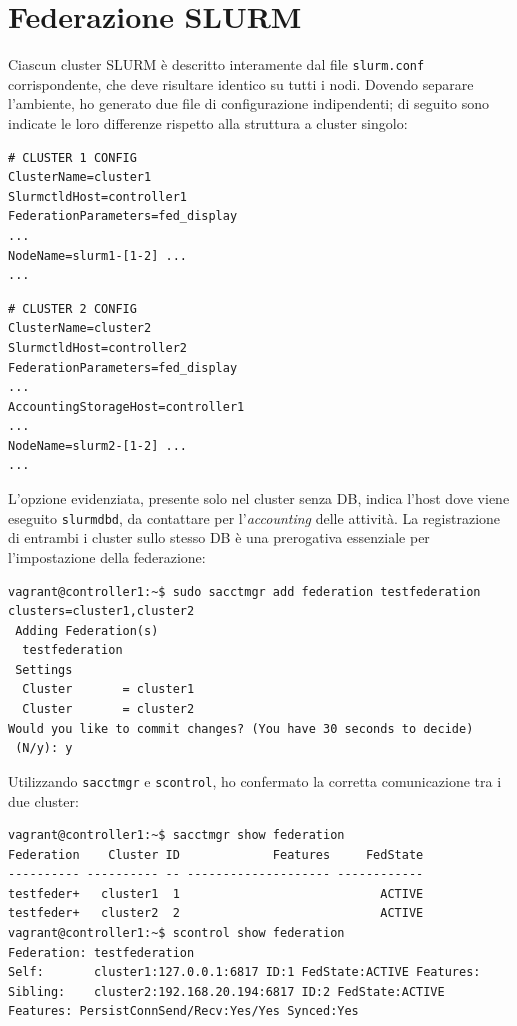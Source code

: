 \documentclass[12pt,a4paper,twoside,openright]{book}
\begin{document}
\section{Federazione SLURM}
Ciascun cluster \ac{SLURM} è descritto interamente dal file \texttt{slurm.conf} corrispondente, che deve risultare identico su tutti i nodi. Dovendo separare l'ambiente, ho generato due file di configurazione indipendenti; di seguito sono indicate le loro differenze rispetto alla struttura a cluster singolo:
\begin{verbatim}
# CLUSTER 1 CONFIG
ClusterName=cluster1
SlurmctldHost=controller1
FederationParameters=fed_display
...
NodeName=slurm1-[1-2] ...
...
\end{verbatim}
\begin{verbatim}
# CLUSTER 2 CONFIG
ClusterName=cluster2
SlurmctldHost=controller2
FederationParameters=fed_display
...
AccountingStorageHost=controller1
...
NodeName=slurm2-[1-2] ...
...
\end{verbatim}
L'opzione evidenziata, presente solo nel cluster senza \ac{DB}, indica l'host dove viene eseguito \texttt{slurmdbd}, da contattare per l'\textit{accounting} delle attività. La registrazione di entrambi i cluster sullo stesso \ac{DB} è una prerogativa essenziale per l'impostazione della federazione:
\begin{verbatim}
vagrant@controller1:~$ sudo sacctmgr add federation testfederation clusters=cluster1,cluster2
 Adding Federation(s)
  testfederation
 Settings
  Cluster       = cluster1
  Cluster       = cluster2
Would you like to commit changes? (You have 30 seconds to decide)
 (N/y): y
\end{verbatim}
Utilizzando \texttt{sacctmgr} e \texttt{scontrol}, ho confermato la corretta comunicazione tra i due cluster:
\begin{verbatim}
vagrant@controller1:~$ sacctmgr show federation
Federation    Cluster ID             Features     FedState
---------- ---------- -- -------------------- ------------
testfeder+   cluster1  1                            ACTIVE
testfeder+   cluster2  2                            ACTIVE
vagrant@controller1:~$ scontrol show federation
Federation: testfederation
Self:       cluster1:127.0.0.1:6817 ID:1 FedState:ACTIVE Features:
Sibling:    cluster2:192.168.20.194:6817 ID:2 FedState:ACTIVE Features: PersistConnSend/Recv:Yes/Yes Synced:Yes
\end{verbatim}
\end{document}
